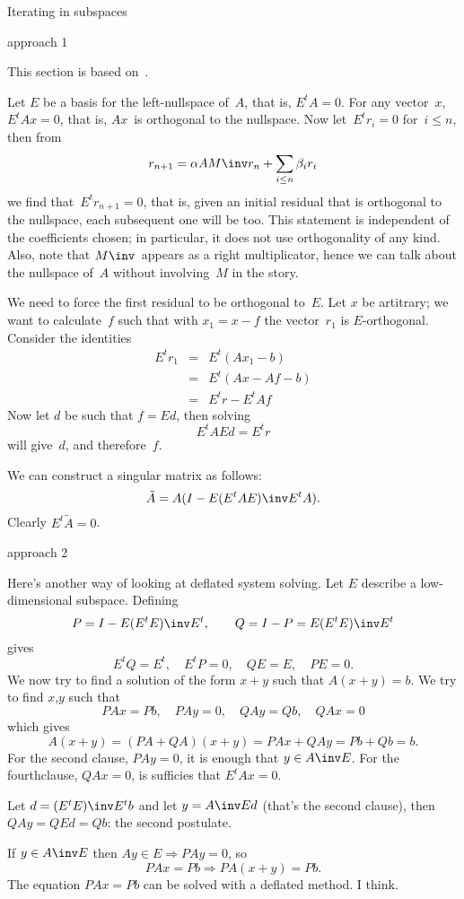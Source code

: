  {Iterating in subspaces}
\FurtherReading

 {approach 1}

This section is based on~\cite{Ni:deflation-cg}.

Let $E$ be a basis for the left-nullspace of~$A$,
that is, $E^tA=0$.  For any vector~$x$, $E^tAx=0$, that is, $Ax$~is
orthogonal to the nullspace.  Now let~$E^tr_i=0$ for~$i\leq n$, then
from
\[ r_{n+1} = \alpha AM\inv r_n+\sum_{i\leq n}\beta_i r_i \]
we find that~$E^tr_{n+1}=0$, that is, given an initial residual that
is orthogonal to the nullspace, each subsequent one will be too. This
statement is independent of the coefficients chosen; in particular, it
does not use orthogonality of any kind. Also, note
that $M\inv$~appears as a right multiplicator, hence we can talk about
the nullspace of~$A$ without involving~$M$ in the story.

We need to force the first residual to be orthogonal to~$E$. Let $x$
be artitrary; we want to calculate~$f$ such that with $x_1=x-f$ the
vector~$r_1$ is $E$-orthogonal. Consider the identities
\begin{eqnarray*}
E^tr_1&=&E^t(Ax_1-b)\\
&=&E^t(Ax-Af-b)\\
&=&E^tr-E^tAf
\end{eqnarray*}
Now let $d$ be such that $f=Ed$, then solving \[E^tAEd=E^tr\] will
give~$d$, and therefore~$f$.

We can construct a singular matrix as follows:
\[ \tilde A=A(I-E(E^tAE)\inv E^tA). \]
Clearly $E^t\tilde A=0$.

 {approach 2}

Here's another way of looking at deflated system solving. Let $E$
describe a low-dimensional subspace. Defining
\[ P=I-E(E^tE)\inv E^t,\qquad Q=I-P=E(E^tE)\inv E^t \]
gives
\[ E^tQ=E^t,\quad E^tP=0,\quad QE=E,\quad PE=0.\]
We now try to find a solution of the form $x+y$ such that
$A(x+y)=b$. We try to find $x$,$y$ such that
\[ PAx=Pb,\quad PAy=0,\quad QAy=Qb,\quad QAx=0 \]
which gives
\[ A(x+y)=(PA+QA)(x+y)=PAx+QAy=Pb+Qb=b.\]
For the second clause, $PAy=0$, it is enough that $y\in A\inv E$.
For the fourthclause, $QAx=0$, is sufficies that $E^tAx=0$.

Let $d=(E^tE)\inv E^tb$ and let $y=A\inv Ed$ (that's the second
clause), then $QAy=QEd=Qb$: the second postulate.

If $y\in A\inv E$ then $Ay\in E\Rightarrow PAy=0$, so
\[ PAx=Pb \Rightarrow PA(x+y)=Pb.\]
The equation $PAx=Pb$ can be solved with a deflated method. I think.

